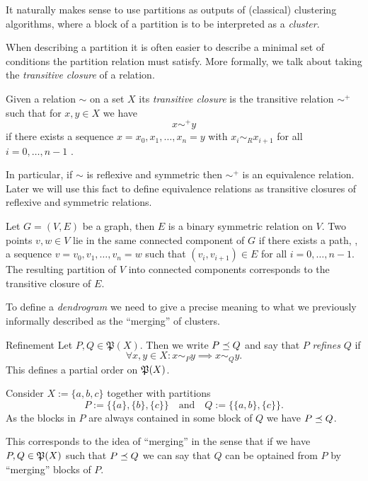 It naturally makes sense to use partitions as outputs of (classical) clustering algorithms, where a block of a partition is to be interpreted as a \emph{cluster}.

When describing a partition it is often easier to describe a minimal set of conditions the partition relation must satisfy. More formally, we talk about taking the \emph{transitive closure} of a relation.

\begin{definition}{}{}
    Given a relation $\sim$ on a set $X$ its \emph{transitive closure} is the transitive relation $\sim^+$ such that for $x,y \in X$ we have
    $$
    x \sim^+ y
    $$
    if there exists a sequence $x = x_0, x_1, \dots, x_n = y$ with $x_i \sim_R x_{i+1}$ for all $i = 0, \dots, n-1$ \cite[p.337]{Lidl1997-kc}.
\end{definition}

In particular, if $\sim$ is reflexive and symmetric then $\sim^+$ is an equivalence relation.
Later we will use this fact to define equivalence relations as transitive closures of reflexive and symmetric relations.

\begin{example}{}{}
Let $G = (V,E)$ be a graph, then $E$ is a binary symmetric relation on $V$. Two points $v,w \in V$ lie in the same connected component of $G$ if there exists a path, \ie, a sequence $v =v_0, v_1, \dots, v_n = w$ such that $(v_i, v_{i+1}) \in E$ for all $i = 0, \dots, n-1$. The resulting partition of $V$ into connected components corresponds to the transitive closure of $E$.
\end{example}

To define a \emph{dendrogram} we need to give a precise meaning to what we previously informally described as the ``merging'' of clusters.

\begin{definition}{Refinement}{}
Let $P, Q \in \mathfrak{P}(X)$. Then we write $P \refines Q$ and say that $P$ \emph{refines} $Q$ if
\begin{equation*}
    \forall x,y \in X: x \sim_P y \implies x \sim_Q y.
\end{equation*}
This defines a partial order on $\P(X)$.
\end{definition}

\begin{example}{}{}
Consider $X := \{a,b,c\}$ together with partitions
$$
P := \{\{a\}, \{b\}, \{c\}\} \quad \text{and} \quad Q := \{\{a,b\}, \{c\}\}.
$$
As the blocks in $P$ are always contained in some block of $Q$ we have $P \refines Q$.
\end{example}
This corresponds to the idea of ``merging'' in the sense that if we have $P,Q \in \P(X)$ such that $P \refines Q$ we can say that $Q$ can be optained from $P$ by ``merging'' blocks of $P$.

